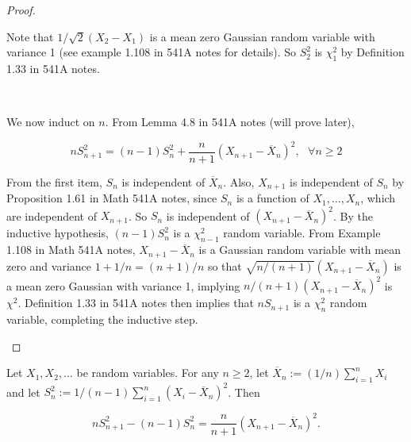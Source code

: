 \begin{proof}
\begin{enumerate}[(i)]
Note that \(1/\sqrt{2} (X_2 - X_1)\) is a mean zero Gaussian random variable with variance 1 (see example 1.108 in 541A notes for details). So \(S_2^2\) is \(\chi_1^2\) by Definition 1.33 in 541A notes.

\

We now induct on \(n\). From Lemma 4.8 in 541A notes (will prove later),

\[
n S_{n+1}^2 = (n-1) S_n^2 + \frac{n}{n+1}(X_{n+1} - \overline{X}_n)^2, \ \ \ \forall n \geq 2
\]

From the first item, \(S_n\) is independent of \(\overline{X}_n\). Also, \(X_{n+1}\) is independent of \(S_n\) by Proposition 1.61 in Math 541A notes, since \(S_n\) is a function of \(X_1, \ldots, X_n\), which are independent of \(X_{n+1}\). So \(S_n\) is independent of \((X_{n+1} - \overline{X}_n)^2\). By the inductive hypothesis, \((n-1)S_n^2\) is a \(\chi_{n-1}^2\) random variable. From Example 1.108 in Math 541A notes, \(X_{n+1} - \overline{X}_n\) is a Gaussian random variable with mean zero and variance \(1 + 1/n = (n+1)/n\) so that \(\sqrt{n/(n+1)} (X_{n+1} - \overline{X}_n)\) is a mean zero Gaussian with variance 1, implying \(n/(n+1) (X_{n+1} - \overline{X}_n)^2\) is \(\chi^2\). Definition 1.33 in 541A notes then implies that \(nS_{n+1}\) is a \(\chi_n^2\) random variable, completing the inductive step.

\end{enumerate}

\end{proof}

\begin{lemma}

\end{lemma} Let \(X_1, X_2, \ldots\) be random variables. For any \(n \geq 2\), let \(\overline{X}_n:= (1/n)\sum_{i=1}^n X_i\) and let \(S_n^2:= 1/(n-1) \sum_{i=1}^n (X_i - \overline{X}_n)^2\). Then

\[
n S_{n+1}^2  - (n-1)S_n^2 =\frac{n}{n+1}(X_{n+1} - \overline{X}_n)^2.
\]

